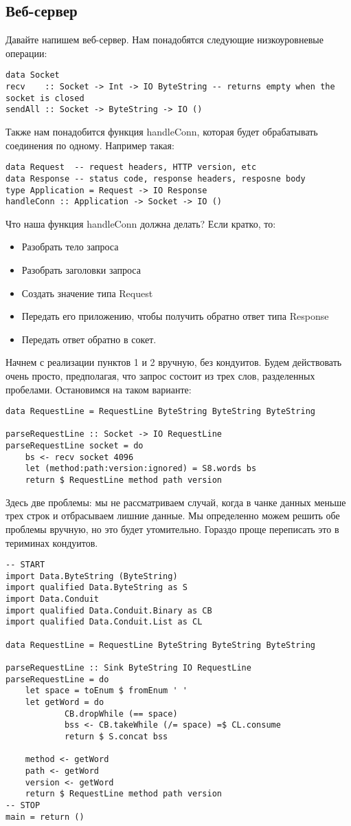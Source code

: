 \subsection{Веб-сервер}

Давайте напишем веб-сервер. Нам понадобятся следующие низкоуровневые операции:
\begin{lstlisting}
data Socket
recv    :: Socket -> Int -> IO ByteString -- returns empty when the socket is closed
sendAll :: Socket -> ByteString -> IO ()
\end{lstlisting}
Также нам понадобится функция handleConn, которая будет обрабатывать соединения по одному. Например такая:
\begin{lstlisting}
data Request  -- request headers, HTTP version, etc
data Response -- status code, response headers, resposne body
type Application = Request -> IO Response
handleConn :: Application -> Socket -> IO ()
\end{lstlisting}
Что наша функция handleConn должна делать? Если кратко, то:
\begin{itemize}  
\item   Разобрать тело запроса
\item   Разобрать заголовки запроса
\item   Создать значение типа Request
\item   Передать его приложению, чтобы получить обратно ответ типа Response
\item   Передать ответ обратно в сокет.
\end{itemize}  
Начнем с реализации пунктов 1 и 2 вручную, без кондуитов. Будем действовать очень просто, предполагая, что запрос состоит из трех слов, разделенных пробелами. Остановимся на таком варианте:
\begin{lstlisting}
data RequestLine = RequestLine ByteString ByteString ByteString

parseRequestLine :: Socket -> IO RequestLine
parseRequestLine socket = do
    bs <- recv socket 4096
    let (method:path:version:ignored) = S8.words bs
    return $ RequestLine method path version
\end{lstlisting}
Здесь две проблемы: мы не рассматриваем случай, когда в чанке данных меньше трех строк и отбрасываем лишние данные. Мы определенно можем решить обе проблемы вручную, но это будет утомительно. Гораздо проще переписать это в териминах кондуитов.
\begin{lstlisting}
-- START
import Data.ByteString (ByteString)
import qualified Data.ByteString as S
import Data.Conduit
import qualified Data.Conduit.Binary as CB
import qualified Data.Conduit.List as CL

data RequestLine = RequestLine ByteString ByteString ByteString

parseRequestLine :: Sink ByteString IO RequestLine
parseRequestLine = do
    let space = toEnum $ fromEnum ' '
    let getWord = do
            CB.dropWhile (== space)
            bss <- CB.takeWhile (/= space) =$ CL.consume
            return $ S.concat bss

    method <- getWord
    path <- getWord
    version <- getWord
    return $ RequestLine method path version
-- STOP
main = return ()
\end{lstlisting}
